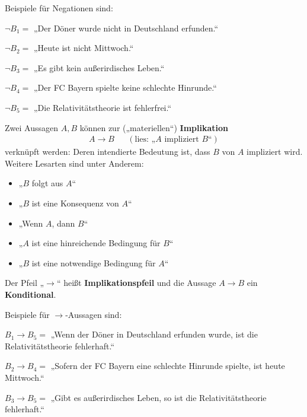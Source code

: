 \begin{bsp}    
    Beispiele für Negationen sind:
    \begin{labeling}[resume*=propbsp]
        \item[$\neg B_1 =$] „Der Döner wurde nicht in Deutschland erfunden.“
        \item[$\neg B_2 =$] „Heute ist nicht Mittwoch.“
        \item[$\neg B_3 =$] „Es gibt kein außerirdisches Leben.“
        \item[$\neg B_4 =$] „Der FC Bayern spielte keine schlechte Hinrunde.“
        \item[$\neg B_5 =$] „Die Relativitätstheorie ist fehlerfrei.“
    \end{labeling}
\end{bsp}


\begin{defin}[Implikationspfeil] 
    Zwei Aussagen $A,B$ können zur („materiellen“) \textbf{Implikation}
    \begin{align*}
        A\to B   && (\text{lies: „$A$ impliziert $B$“})
    \end{align*}
    verknüpft werden: Deren intendierte Bedeutung ist, dass $B$ von $A$ impliziert wird. Weitere Lesarten sind unter Anderem:
    \begin{itemize}
        \item „$B$ folgt aus $A$“
        \item „$B$ ist eine Konsequenz von $A$“
        \item „Wenn $A$, dann $B$“
        \item „$A$ ist eine hinreichende Bedingung für $B$“
        \item „$B$ ist eine notwendige Bedingung für $A$“
    \end{itemize}
    Der Pfeil „$\to$“ heißt \textbf{Implikationspfeil} und die Aussage $A\to B$ ein \textbf{Konditional}.
\end{defin}


\begin{bsp}
    Beispiele für $\to$-Aussagen sind:
    \begin{labeling}[resume*=propbsp]
        \item[$B_1\to B_5=$] „Wenn der Döner in Deutschland erfunden wurde, ist die Relativitätstheorie fehlerhaft.“
        \item[$B_2\to B_4=$] „Sofern der FC Bayern eine schlechte Hinrunde spielte, ist heute Mittwoch.“
        \item[$B_3\to B_5=$] „Gibt es außerirdisches Leben, so ist die Relativitätstheorie fehlerhaft.“
    \end{labeling}
\end{bsp}


